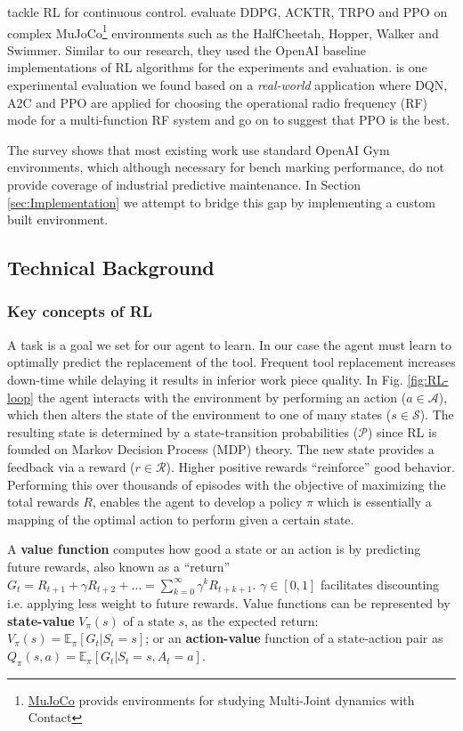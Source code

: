 \documentclass[a4paper, 12pt]{article}
\begin{document}
\cite{dulac2021, henderson2018deep} tackle RL for continuous control. \cite{henderson2018deep} evaluate DDPG, ACKTR, TRPO and PPO on complex MuJoCo\footnote{\href{https://mujoco.org/}{MuJoCo} provids environments for studying Multi-Joint dynamics with Contact} environments such as the HalfCheetah, Hopper, Walker and Swimmer. Similar to our research, they used the OpenAI baseline implementations of RL algorithms for the experiments and evaluation. \cite{ford2022cognitive} is one experimental evaluation we found based on a \textit{real-world} application where DQN, A2C and PPO are applied for choosing the operational radio frequency (RF) mode for a multi-function RF system and go on to suggest that PPO is the best.

The survey shows that most existing work use standard OpenAI Gym environments, which although necessary for bench marking performance, do not provide coverage of industrial predictive maintenance. In Section \ref{sec:Implementation} we attempt to bridge this gap by implementing a custom built environment.

\subsection{Technical Background}
\subsubsection*{Key concepts of RL}
A task is a goal we set for our agent to learn. In our case the agent must learn to optimally predict the replacement of the tool. Frequent tool replacement increases down-time while delaying it results in inferior work piece quality. In Fig. \ref{fig:RL-loop} the agent interacts with the environment by performing an action ($a \in \mathcal{A}$), which then alters the state of the environment to one of many states ($s \in \mathcal{S}$). The resulting state is determined by a state-transition probabilities ($\mathcal{P}$) since RL is founded on Markov Decision Process (MDP) theory. The new state provides a feedback via a reward ($r \in \mathcal{R}$). Higher positive rewards ``reinforce'' good behavior. Performing this over thousands of episodes with the objective of maximizing the total rewards $R$, enables the agent to develop a policy $\pi$ which is essentially a mapping of the optimal action to perform given a certain state.

A \textbf{value function} computes how good a state or an action is by predicting future rewards, also known as a ``return'' $G_t = R_{t+1} + \gamma R_{t+2} + \dots = \sum_{k=0}^{\infty} \gamma^k R_{t+k+1}$. $\gamma \in [0, 1]$ facilitates discounting i.e. applying less weight to future rewards. Value functions can be represented by \textbf{state-value} $V_{\pi}(s)$ of a state $s$, as the expected return: $V_{\pi}(s) = \mathbb{E}_{\pi}[G_t \vert S_t = s]$; or an \textbf{action-value} function of a state-action pair as $Q_{\pi}(s, a) = \mathbb{E}_{\pi}[G_t \vert S_t = s, A_t = a]$.
\end{document}
